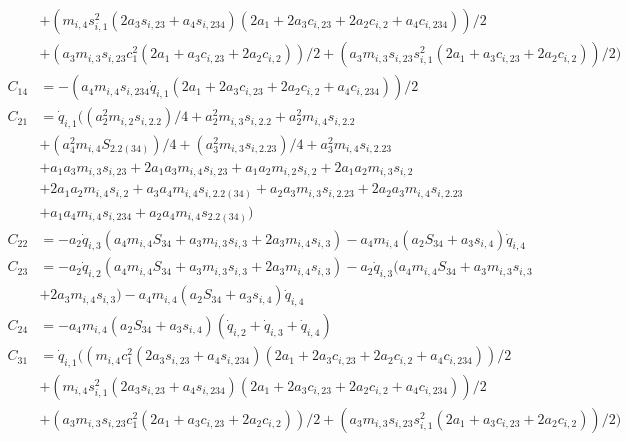 \begin{equation*}
\begin{split}
	 			& + (m_{i,4} s_{i,1}^2 (2 a_{3} s_{i,23} + a_{4} s_{i,234}) (2 a_{1} + 2 a_{3} c_{i,23} + 2 a_{2} c_{i,2} + a_{4} c_{i,234}))/2 \\
	 			& + (a_{3} m_{i,3} s_{i,23} c_{1}^2 (2 a_{1} + a_{3} c_{i,23} + 2 a_{2} c_{i,2}))/2 + (a_{3} m_{i,3} s_{i,23} s_{i,1}^2 (2 a_{1} + a_{3} c_{i,23} + 2 a_{2} c_{i,2}))/2)\\
	 	C_{14} 	& = -(a_{4} m_{i,4} s_{i,234} \dot{q}_{i,1} (2 a_{1} + 2 a_{3} c_{i,23} + 2 a_{2} c_{i,2} + a_{4} c_{i,234}))/2\\
		C_{21} 	& = \dot{q}_{i,1} ((a_{2}^2 m_{i,2} s_{i,2.2})/4 + a_{2}^2 m_{i,3} s_{i,2.2} + a_{2}^2 m_{i,4} s_{i,2.2} \\
				& + (a_{4}^2 m_{i,4} S_{2.2(34)})/4 + (a_{3}^2 m_{i,3} s_{i,2.23})/4 + a_{3}^2 m_{i,4} s_{i,2.23} \\
				& + a_{1} a_{3} m_{i,3} s_{i,23} + 2 a_{1} a_{3} m_{i,4} s_{i,23} + a_{1} a_{2} m_{i,2} s_{i,2} + 2 a_{1} a_{2} m_{i,3} s_{i,2} \\
				& + 2 a_{1} a_{2} m_{i,4} s_{i,2} + a_{3} a_{4} m_{i,4} s_{i,2.2(34)} + a_{2} a_{3} m_{i,3} s_{i,2.23} + 2 a_{2} a_{3} m_{i,4} s_{i,2.23} \\
				& + a_{1} a_{4} m_{i,4} s_{i,234} + a_{2} a_{4} m_{i,4} s_{2.2(34)})\\
	   	C_{22} 	& = -a_{2} \dot{q}_{i,3} (a_{4} m_{i,4} S_{34} + a_{3} m_{i,3} s_{i,3} + 2 a_{3} m_{i,4} s_{i,3}) - a_{4} m_{i,4} (a_{2} S_{34} + a_{3} s_{i,4}) \dot{q}_{i,4}\\
	   	C_{23} 	& = -a_{2} \dot{q}_{i,2} (a_{4} m_{i,4} S_{34} + a_{3} m_{i,3} s_{i,3} + 2 a_{3} m_{i,4} s_{i,3}) - a_{2} \dot{q}_{i,3} (a_{4} m_{i,4} S_{34} + a_{3} m_{i,3} s_{i,3} \\
	   			& + 2 a_{3} m_{i,4} s_{i,3}) - a_{4} m_{i,4} (a_{2} S_{34} + a_{3} s_{i,4}) \dot{q}_{i,4}\\
	    C_{24} 	& = -a_{4} m_{i,4} (a_{2} S_{34} + a_{3} s_{i,4}) (\dot{q}_{i,2} + \dot{q}_{i,3} + \dot{q}_{i,4})\\
	 	C_{31} 	& = \dot{q}_{i,1} ((m_{i,4} c_{1}^2 (2 a_{3} s_{i,23} + a_{4} s_{i,234}) (2 a_{1} + 2 a_{3} c_{i,23} + 2 a_{2} c_{i,2} + a_{4} c_{i,234}))/2 \\
	 			& + (m_{i,4} s_{i,1}^2 (2 a_{3} s_{i,23} + a_{4} s_{i,234}) (2 a_{1} + 2 a_{3} c_{i,23} + 2 a_{2} c_{i,2} + a_{4} c_{i,234}))/2 \\
	 			& + (a_{3} m_{i,3} s_{i,23} c_{1}^2 (2 a_{1} + a_{3} c_{i,23} + 2 a_{2} c_{i,2}))/2 + (a_{3} m_{i,3} s_{i,23} s_{i,1}^2 (2 a_{1} + a_{3} c_{i,23} + 2 a_{2} c_{i,2}))/2)\\

\end{split}
\end{equation*}
